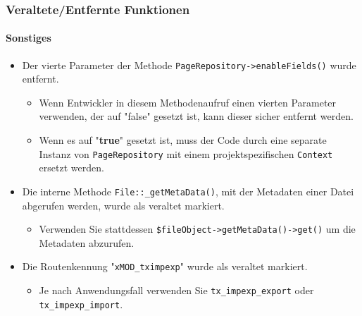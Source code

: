 \begin{frame}[fragile]
	\frametitle{Veraltete/Entfernte Funktionen}
	\framesubtitle{Sonstiges}

	\begin{itemize}

		\item Der vierte Parameter der Methode \texttt{PageRepository->enableFields()} wurde entfernt.

		\begin{itemize}\smaller
			\item[\ding{228}] Wenn Entwickler in diesem Methodenaufruf einen vierten Parameter verwenden, der auf "false" gesetzt ist, kann dieser sicher entfernt werden.
			\item[\ding{228}] Wenn es auf "\textbf{true}" gesetzt ist, muss der Code durch eine separate Instanz von \texttt{PageRepository} mit einem projektspezifischen \texttt{Context} ersetzt werden.
		\end{itemize}\normalsize

		\item Die interne Methode \texttt{File::\_getMetaData()}, mit der Metadaten einer Datei abgerufen werden,
			wurde als veraltet markiert.

			\begin{itemize}\smaller
				\item[\ding{228}] Verwenden Sie stattdessen \texttt{\$fileObject->getMetaData()->get()} um die Metadaten abzurufen.
			\end{itemize}\normalsize

		\item Die Routenkennung "\texttt{xMOD\_tximpexp}" wurde als veraltet markiert.

			\begin{itemize}\smaller
				\item[\ding{228}] Je nach Anwendungsfall verwenden Sie \texttt{tx\_impexp\_export} oder \texttt{tx\_impexp\_import}.
			\end{itemize}\normalsize

	\end{itemize}

\end{frame}


